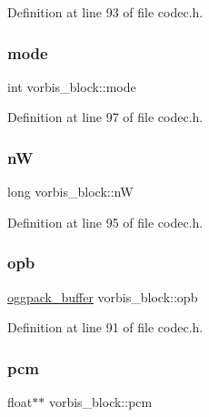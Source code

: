 Definition at line 93 of file codec.\+h.

\mbox{\label{structvorbis__block_adab44bb8520c9d5daafee3f1a1bcf538}} 
\subsubsection{\texorpdfstring{mode}{mode}}
{\footnotesize\ttfamily int vorbis\+\_\+block\+::mode}



Definition at line 97 of file codec.\+h.

\mbox{\label{structvorbis__block_a6fa002c8c36ad39c1c015cfa673dda28}} 
\subsubsection{\texorpdfstring{nW}{nW}}
{\footnotesize\ttfamily long vorbis\+\_\+block\+::nW}



Definition at line 95 of file codec.\+h.

\mbox{\label{structvorbis__block_a43f1746974a729fa4e835ef995f9782a}} 
\subsubsection{\texorpdfstring{opb}{opb}}
{\footnotesize\ttfamily \mbox{\hyperlink{structoggpack__buffer}{oggpack\+\_\+buffer}} vorbis\+\_\+block\+::opb}



Definition at line 91 of file codec.\+h.

\mbox{\label{structvorbis__block_ac8312d70a6e63afc01d3df8a54ac6508}} 
\subsubsection{\texorpdfstring{pcm}{pcm}}
{\footnotesize\ttfamily float$\ast$$\ast$ vorbis\+\_\+block\+::pcm}



